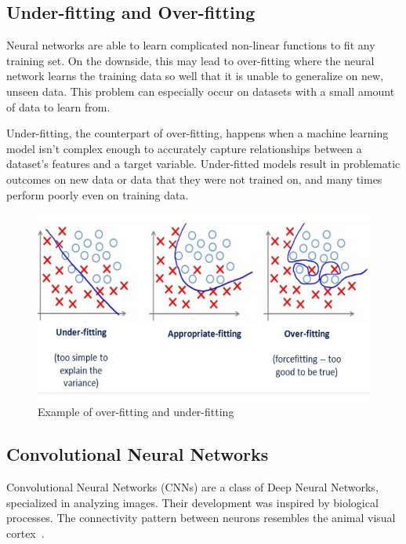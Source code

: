 \clearpage
\subsection{Under-fitting and Over-fitting}

Neural networks are able to learn complicated non-linear functions to fit any training set. On the downside, this may lead to over-fitting where the neural network learns the training data so well that it is unable to generalize on new, unseen data. This problem can especially occur on datasets with a small amount of data to learn from. \par

Under-fitting, the counterpart of over-fitting, happens when a machine learning model isn’t complex enough to accurately capture relationships between a dataset’s features and a target variable. Under-fitted models result in problematic outcomes on new data or data that they  were not trained on, and many times perform poorly even on training data. \par


\begin{figure}[h]
	\caption[Example of over-fitting and under-fitting]{Example of over-fitting and under-fitting~\cite{vitaflux}}
	\centering
	\includegraphics[width=1\textwidth, height=\textheight, keepaspectratio]{"resources/overfitting"}
\end{figure}

\subsection{Convolutional Neural Networks}
\par
Convolutional Neural Networks (CNNs) are a class of Deep Neural Networks,
specialized in analyzing images. Their development was inspired by biological processes.
The connectivity pattern between neurons resembles the animal visual cortex~\cite{cnn}. \par

